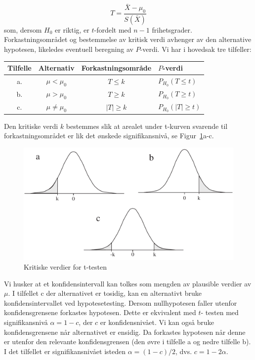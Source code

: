 \[    T=\frac{\bar{X}- {\mu}_0}{S(\bar{X})}\]
som, dersom $H_0$ er riktig, er $t$-fordelt med $n-1$
frihetsgrader. Forkastningsområdet og bestemmelse av kritisk
verdi avhenger av den alternative hypotesen, likeledes eventuell
beregning av $P$-verdi. Vi har i hovedsak tre tilfeller:
\begin{center}
\begin{tabular}{cccl}
Tilfelle  & Alternativ  &   Forkastningsområde &  $P$-verdi \\ \hline
a. & $\mu< {\mu}_0$     &    $T\le k$         &   $P_{H_0}(T\le t)$\\
b. & $\mu > {\mu}_0 $   &    $T\ge k$         &   $P_{H_0}(T\ge t)$ \\
c. & $\mu \ne {\mu}_0$  &   $\mid T\mid \ge k$&$P_{H_0}(\mid T\mid \ge t)$\\ \hline 
\end{tabular}
\end{center}
Den kritiske verdi $k$ bestemmes slik at arealet under t-kurven
svarende til forkastningsområdet er lik det ønskede
signifikansnivå, se Figur~\ref{fig:krit_verdi_t}a-c.

\begin{figure}[ht]
\centering
	 \includegraphics[scale=0.6]{figurer/fig8_7.pdf} 
 \caption{Kritiske verdier for t-testen}
	\label{fig:krit_verdi_t}
\end{figure}
Vi husker at et konfidensintervall kan tolkes som mengden av
plausible verdier av $\mu$. I tilfellet c der alternativet er
tosidig, kan en alternativt bruke konfidensintervallet ved
hypotesetesting. Dersom nullhypotesen faller utenfor
konfidensgrensene forkastes hypotesen. Dette er ekvivalent med $t$-
testen med signifikansnivå $\alpha =1-c$, der $c$ er
konfidensnivået. Vi kan også bruke konfidensgrensene
når alternativet er ensidig. Da forkastes hypotesen når
denne er utenfor den relevante konfidensgrensen (den øvre i
tilfelle a og nedre tilfelle b). I det tilfellet er
signifikansnivået isteden $\alpha=(1-c)/2$, dvs. $c=1-2\alpha$.\\

